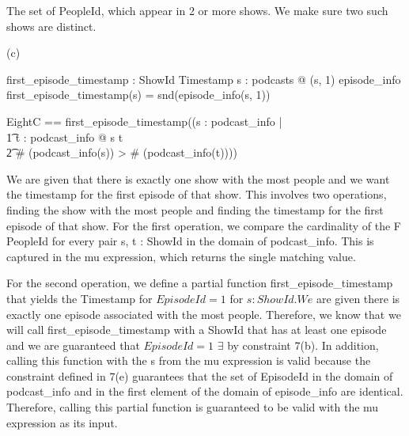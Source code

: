 \documentclass[a4paper,10pt,fleqn]{article}
\begin{document}
\bigskip

\setlength{\leftskip}{\dimexpr\parindent+2em\relax}
\noindent The set of PeopleId, which appear in 2 or more shows.  We make sure two such shows are distinct.

\bigskip

\setlength{\leftskip}{0pt}
\medskip

\noindent\hspace*{\parindent}(c) \begin{axdef}
first\_episode\_timestamp : ShowId \pfun Timestamp
\where
\forall s : podcasts @ (s, 1) \in \dom episode\_info \implies first\_episode\_timestamp(s) = snd(episode\_info(s, 1))
\end{axdef}


\bigskip

\setlength{\leftskip}{\dimexpr\parindent+2em\relax}
\begin{zed}
EightC == first\_episode\_timestamp((\mu s : \dom podcast\_info | \\
\t1 \forall t : \dom podcast\_info @ s \neq t \land \\
\t2 \# (podcast\_info(s)) > \# (podcast\_info(t))))
\end{zed}

\noindent We are given that there is exactly one show with the most people and we want the timestamp for the first episode of that show. This involves two operations, finding the show with the most people and finding the timestamp for the first episode of that show.  For the first operation, we compare the cardinality of the F PeopleId for every pair s, t : ShowId in the domain of podcast\_info. This is captured in the mu expression, which returns the single matching value.

\bigskip

\noindent For the second operation, we define a partial function first\_episode\_timestamp that yields the Timestamp for $EpisodeId = 1$ for $s : ShowId.  We$ are given there is exactly one episode associated with the most people. Therefore, we know that we will call first\_episode\_timestamp with a ShowId that has at least one episode and we are guaranteed that $EpisodeId = 1$ $\exists$ by constraint 7(b). In addition, calling this function with the s from the mu expression is valid because the constraint defined in 7(e) guarantees that the set of EpisodeId in the domain of podcast\_info and in the first element of the domain of episode\_info are identical. Therefore, calling this partial function is guaranteed to be valid with the mu expression as its input.
\end{document}
